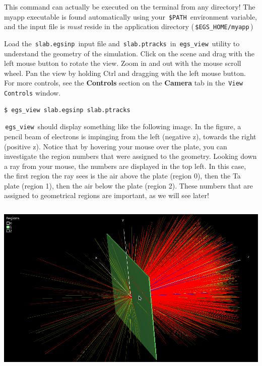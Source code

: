 \documentclass[12pt,twoside]{article}
\begin{document}
This command can actually be executed on the terminal from any directory! The myapp executable is found automatically using your \,\Verb|$PATH|\, environment variable, and the input file is \textit{must} reside in the application directory (\,\Verb|$EGS_HOME/myapp|\,)

Load the \,\Verb|slab.egsinp|\, input file and \,\Verb|slab.ptracks|\, in
\,\Verb|egs_view|\, utility to understand the geometry of the simulation.
Click on the scene and drag with the left mouse button to rotate the view.
Zoom in and out with the mouse scroll wheel. Pan
the view by holding Ctrl and dragging with the left mouse button. For more controls, see the \textbf{Controls} section on the \textbf{Camera} tab in the \,\Verb|View Controls| window.

\begin{lstlisting}
$ egs_view slab.egsinp slab.ptracks
\end{lstlisting}

\,\Verb|egs_view|\, should display something
like the following image. In the figure, a pencil beam of electrons is impinging
from the left (negative z), towards the right (positive z).
Notice that by hovering your mouse over the plate, you
can investigate the region numbers that were assigned to the geometry. Looking
down a ray from your mouse, the numbers are displayed in the top left. In this
case, the first region the ray sees is the air above the plate (region 0), then
the Ta plate (region 1), then the air below the plate (region 2). These numbers
that are assigned to geometrical regions are important, as we will see later!

\begin{center}
\includegraphics[height=240pt]{figures/ta-plate-example}
\end{center}
\end{document}
